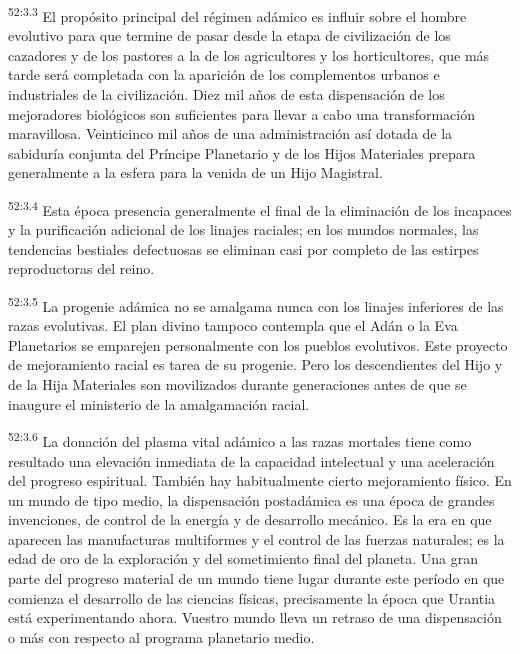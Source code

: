 \par
\textsuperscript{52:3.3} El propósito principal del régimen adámico es influir sobre el hombre evolutivo para que termine de pasar desde la etapa de civilización de los cazadores y de los pastores a la de los agricultores y los horticultores, que más tarde será completada con la aparición de los complementos urbanos e industriales de la civilización. Diez mil años de esta dispensación de los mejoradores biológicos son suficientes para llevar a cabo una transformación maravillosa. Veinticinco mil años de una administración así dotada de la sabiduría conjunta del Príncipe Planetario y de los Hijos Materiales prepara generalmente a la esfera para la venida de un Hijo Magistral.

\par
\textsuperscript{52:3.4} Esta época presencia generalmente el final de la eliminación de los incapaces y la purificación adicional de los linajes raciales; en los mundos normales, las tendencias bestiales defectuosas se eliminan casi por completo de las estirpes reproductoras del reino.

\par
\textsuperscript{52:3.5} La progenie adámica no se amalgama nunca con los linajes inferiores de las razas evolutivas. El plan divino tampoco contempla que el Adán o la Eva Planetarios se emparejen personalmente con los pueblos evolutivos. Este proyecto de mejoramiento racial es tarea de su progenie. Pero los descendientes del Hijo y de la Hija Materiales son movilizados durante generaciones antes de que se inaugure el ministerio de la amalgamación racial.

\par
\textsuperscript{52:3.6} La donación del plasma vital adámico a las razas mortales tiene como resultado una elevación inmediata de la capacidad intelectual y una aceleración del progreso espiritual. También hay habitualmente cierto mejoramiento físico. En un mundo de tipo medio, la dispensación postadámica es una época de grandes invenciones, de control de la energía y de desarrollo mecánico. Es la era en que aparecen las manufacturas multiformes y el control de las fuerzas naturales; es la edad de oro de la exploración y del sometimiento final del planeta. Una gran parte del progreso material de un mundo tiene lugar durante este período en que comienza el desarrollo de las ciencias físicas, precisamente la época que Urantia está experimentando ahora. Vuestro mundo lleva un retraso de una dispensación o más con respecto al programa planetario medio.

